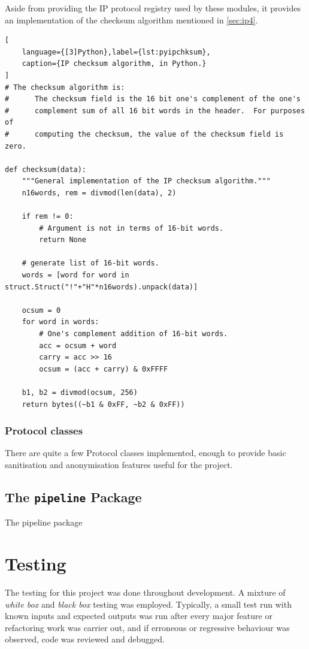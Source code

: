 \documentclass[10pt,a4paper,notitlepage,twoside]{report}
\begin{document}
Aside from providing the IP protocol registry used by these modules, it provides an implementation of the checksum algorithm mentioned in \ref{sec:ip4}.
\begin{lstlisting}[
	language={[3]Python},label={lst:pyipchksum},
	caption={IP checksum algorithm, in Python.}
]
# The checksum algorithm is:
#      The checksum field is the 16 bit one's complement of the one's
#      complement sum of all 16 bit words in the header.  For purposes of
#      computing the checksum, the value of the checksum field is zero.

def checksum(data):
    """General implementation of the IP checksum algorithm."""
    n16words, rem = divmod(len(data), 2)

    if rem != 0:
        # Argument is not in terms of 16-bit words.
        return None

    # generate list of 16-bit words.
    words = [word for word in struct.Struct("!"+"H"*n16words).unpack(data)]

    ocsum = 0
    for word in words:
        # One's complement addition of 16-bit words.
        acc = ocsum + word
        carry = acc >> 16
        ocsum = (acc + carry) & 0xFFFF

    b1, b2 = divmod(ocsum, 256)
    return bytes((~b1 & 0xFF, ~b2 & 0xFF))
\end{lstlisting}

\subsection{Protocol classes}
There are quite a few Protocol classes implemented, enough to provide basic sanitisation and anonymisation features useful for the project.

\section{The \texttt{pipeline} Package}
The pipeline package 

\chapter{Testing}
The testing for this project was done throughout development. 
A mixture of \emph{white box} and \emph{black box} testing was employed. Typically, a small test run with known inputs and expected outputs was run after every major feature or refactoring work was carrier out, and if erroneous or regressive behaviour was observed, code was reviewed and debugged.
\end{document}
